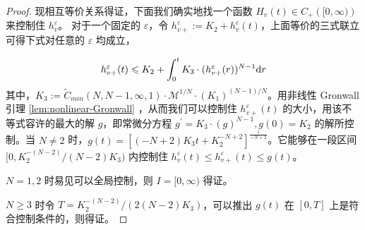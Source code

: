 \begin{proof}
现相互等价关系得证，下面我们确实地找一个函数 $H_v(t)\in C_+\left([0,\infty)\right)$ 来控制住 $h_v^\varepsilon$。
对于一个固定的 $\varepsilon$，令 $h_{v+}^\varepsilon:=K_2+h_v^\varepsilon(t)$，上面等价的三式联立可得下式对任意的 $\varepsilon$ 均成立，






\begin{equation}
h_{v+}^\varepsilon(t) \leqslant K_{2}+\int_{0}^{t} K_{3} \cdot(h_{v+}^\varepsilon(r))^{N-1} \mathrm{d} r \\
\end{equation}
其中，$K_{3}:=\tilde{C}_{min}(N, N-1, \infty, 1) \cdot \mathcal{M}^{1 / N} \cdot\left(K_{1}\right)^{(N-1) / N}$。用非线性 Gronwall 引理 \ref{lem:nonlinear-Gronwall} ，从而我们可以控制住 $h_{v+}^\varepsilon(t) $ 的大小，用该不等式容许的最大的解 $g$，即常微分方程 $g^{\prime}=K_{3} \cdot(g)^{N-1}, g(0)=K_{2}$ 的解所控制。当 $N\neq 2$ 时，$g(t) = [(-N+2)K_3 t+K_2^{-N+2}]^{\frac{1}{-N+2}}$。它能够在一段区间 $[0, K_2^{-(N-2)}/(N-2)K_3)$ 内控制住 $h_{v}^\varepsilon(t) \leqslant h_{v+}^\varepsilon(t) \leqslant g(t)$。  

$N=1,2$ 时易见可以全局控制，则 $I=[0, \infty)$ 得证。

$N \geqslant 3$ 时令 $T=K_2^{-(N-2)}/(2(N-2)K_3)$，可以推出 $g(t)$ 在 $[0, T]$ 上是符合控制条件的，则得证。

\end{proof}


